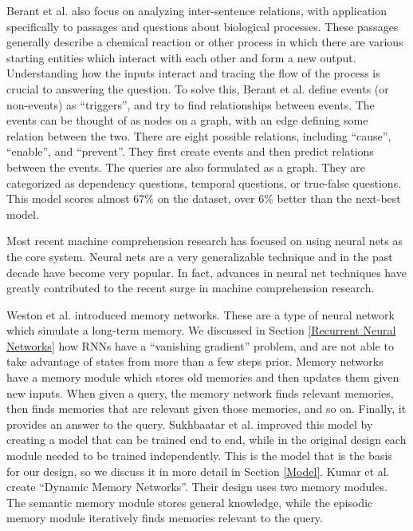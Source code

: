 \documentclass[pageno]{jpaper}
\begin{document}
Berant et al. \cite{Berant2014} also focus on analyzing inter-sentence
relations, with application specifically to passages and questions about
biological processes. These passages generally describe a chemical reaction or
other process in which there are various starting entities which interact with
each other and form a new output. Understanding how the inputs interact and
tracing the flow of the process is crucial to answering the question. To solve
this, Berant et al. define events (or non-events) as ``triggers'', and try to
find relationships between events. The events can be thought of as nodes on a
graph, with an edge defining some relation between the two. There are eight
possible relations, including ``cause'', ``enable'', and ``prevent''. They first
create events and then predict relations between the events. The queries are
also formulated as a graph. They are categorized as dependency questions,
temporal questions, or true-false questions. This model scores almost 67\% on
the dataset, over 6\% better than the next-best model.

Most recent machine comprehension research has focused on using neural nets as
the core system. Neural nets are a very generalizable technique and in the past
decade have become very popular. In fact, advances in neural net techniques have
greatly contributed to the recent surge in machine comprehension research.

Weston et al. \cite{Weston2015a} introduced memory networks. These are a type of
neural network which simulate a long-term memory. We discussed in Section
\ref{Recurrent Neural Networks} how RNNs have a ``vanishing gradient'' problem,
and are not able to take advantage of states from more than a few steps prior.
Memory networks have a memory module which stores old memories and then updates
them given new inputs. When given a query, the memory network finds relevant
memories, then finds memories that are relevant given those memories, and so on.
Finally, it provides an answer to the query. Sukhbaatar et al.
\cite{Sukhbaatar2015} improved this model by creating a model that can be
trained end to end, while in the original design each module needed to be
trained independently. This is the model that is the basis for our design, so we
discuss it in more detail in Section \ref{Model}. Kumar et al. \cite{Kumar2015}
create ``Dynamic Memory Networks''. Their design uses two memory modules. The
semantic memory module stores general knowledge, while the episodic memory
module iteratively finds memories relevant to the query.
\end{document}
